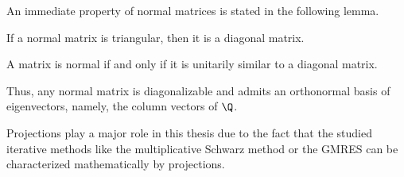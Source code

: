 An immediate property of normal matrices is stated in the following lemma.
%
\begin{lemma}
If a normal matrix is triangular, then it is a diagonal matrix.
\end{lemma}
%
\begin{thm}
A matrix is normal if and only if it is unitarily similar to a diagonal
matrix.
\end{thm}
%
Thus, any normal matrix is diagonalizable and admits an orthonormal basis of
eigenvectors, namely, the column vectors of $\Q$.

Projections play a major role in this thesis due to the fact that the
studied iterative methods like the multiplicative Schwarz method or the GMRES
can be characterized mathematically by projections.


%
%

